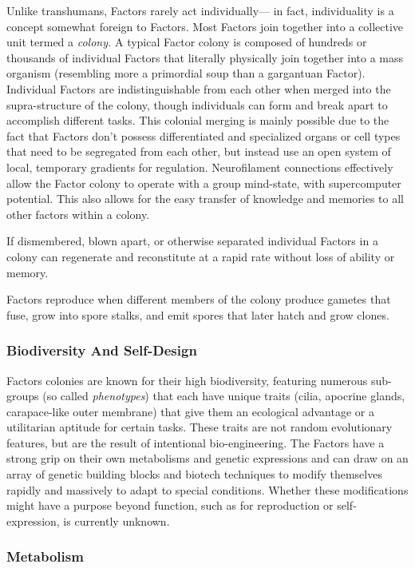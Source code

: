 Unlike transhumans, Factors rarely act individually—
in fact, individuality is a concept somewhat foreign 
to Factors. Most Factors join together into a collective
unit termed a \textit{colony.} A typical Factor colony is
composed of hundreds or thousands of individual 
Factors that literally physically join together into a 
mass organism (resembling more a primordial soup 
than a gargantuan Factor). Individual Factors are 
indistinguishable from each other when merged into 
the supra-structure of the colony, though individuals 
can form and break apart to accomplish different 
tasks. This colonial merging is mainly possible due 
to the fact that Factors don't possess differentiated 
and specialized organs or cell types that need to be 
segregated from each other, but instead use an open 
system of local, temporary gradients for regulation. 
Neurofilament connections effectively allow the 
Factor colony to operate with a group mind-state, 
with supercomputer potential. This also allows for the 
easy transfer of knowledge and memories to all other 
factors within a colony.

If dismembered, blown apart, or otherwise separated
individual Factors in a colony can regenerate
and reconstitute at a rapid rate without loss of ability 
or memory. 

Factors reproduce when different members of the 
colony produce gametes that fuse, grow into spore 
stalks, and emit spores that later hatch and grow clones.

\subsubsection{Biodiversity And Self-Design }

Factors colonies are known for their high biodiversity, 
featuring numerous sub-groups (so called \textit{phenotypes}) 
that each have unique traits (cilia, apocrine glands, carapace-like
outer membrane) that give them an ecological
advantage or a utilitarian aptitude for certain tasks.
These traits are not random evolutionary features, but 
are the result of intentional bio-engineering. The Factors
have a strong grip on their own metabolisms and
genetic expressions and can draw on an array of genetic
building blocks and biotech techniques to modify
themselves rapidly and massively to adapt to special 
conditions. Whether these modifications might have a 
purpose beyond function, such as for reproduction or 
self-expression, is currently unknown. 

\subsubsection{Metabolism }

